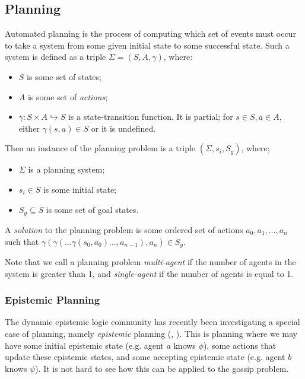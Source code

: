 \documentclass[12pt, a4paper]{article}
\begin{document}
\subsection{Planning}

Automated planning is the process of computing which set of events must occur to
take a system from some given initial state to some successful state. Such a
system is defined as a triple $\Sigma = (S, A, \gamma)$, where:

\begin{itemize}
\item $S$ is some set of states;
\item $A$ is some set of \textit{actions};
\item $\gamma : S \times A \hookrightarrow S$ is a state-transition function. It
  is partial; for $s \in S, a \in A$, either $\gamma(s, a) \in S$ or it is
  undefined. 
\end{itemize}

Then an instance of the planning problem is a triple $(\Sigma, s_i, S_g)$,
where;

\begin{itemize}
\item $\Sigma$ is a planning system;
\item $s_i \in S$ is some initial state;
\item $S_g \subseteq S$ is some set of goal states.  
\end{itemize}

A \textit{solution} to the planning problem is some ordered set of actions
${a_0, a_1, \ldots, a_n}$ such that $\gamma(\gamma(\ldots \gamma(s_0, a_0)
\ldots ,a_{n-1}) ,a_n) \in S_g$. 

Note that we call a planning problem \textit{multi-agent} if the number of
agents in the system is greater than 1, and \textit{single-agent} if the number
of agents is equal to 1. 

\subsubsection{Epistemic Planning}

The dynamic epistemic logic community has recently been investigating a special case
of planning, namely \textit{epistemic} planning (\cite{BolanderEP},
\cite{UndecidabilityEP}). This is planning where we may have some initial
epistemic state (e.g. agent $a$ knows $\phi$), some actions that update these
epistemic states, and some accepting epistemic state (e.g. agent $b$ knows
$\psi$). It is not hard to see how this can be applied to the gossip problem.
\end{document}

